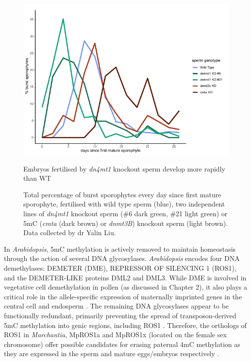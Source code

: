 \begin{figure}[htbp!] 
\centering    
    \includegraphics[width=1\textwidth]{Chapter3/Figs/Intro/burstpeak_nuclei_number.pdf}
\caption{Embryos fertilised by \textit{dn4mt1} knockout sperm develop more rapidly than WT}
\label{fig:burstpeak}
\captionsetup{font=small}
    \caption*{Total percentage of burst sporophytes every day since first mature sporophyte, fertilised with wild type sperm (blue), two independent lines of \textit{dn4mt1} knockout sperm (\#6 dark green, \#21 light green) or 5mC (\textit{cmta} (dark brown) or \textit{dnmt3B}) knockout sperm (light brown). Data collected by dr Yalin Liu.}
\end{figure}

In \textit{Arabidopsis}, 5mC methylation is actively removed to maintain homeostasis through the action of several DNA glycosylases. \textit{Arabidopsis} encodes four DNA demethylases: DEMETER (DME), REPRESSOR OF SILENCING 1 (ROS1), and the DEMETER-LIKE proteins DML2 and DML3. While DME is involved in vegetative cell demethylation in pollen \cite{RN57} (as discussed in Chapter 2), it also plays a critical role in the allele-specific expression of maternally imprinted genes in the central cell and endosperm \cite{RN235}. The remaining DNA glycosylases appear to be functionally redundant, primarily preventing the spread of transposon-derived 5mC methylation into genic regions\cite{RN288}, including ROS1 \cite{RN168}. Therefore, the orthologs of ROS1 in \textit{Marchantia}, MpROS1a and MpROS1x (located on the female sex chromosome) offer possible candidates for erasing paternal 4mC methylation as they are expressed in the sperm \cite{RN212} and mature eggs/embryos \cite{RN257} respectively \cite{RN169,RN257,RN189}.

